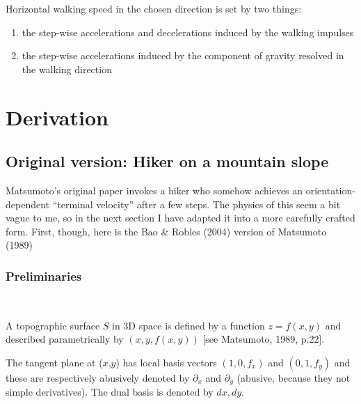 \documentclass[11pt]{article}
\providecommand{\tightlist}{%
      \setlength{\itemsep}{0pt}\setlength{\parskip}{0pt}}
\begin{document}
Horizontal walking speed in the chosen direction is set by two things:

\begin{enumerate}
\def\labelenumi{\arabic{enumi}.}
\tightlist
\item
  the step-wise accelerations and decelerations induced by the walking
  impulses
\item
  the step-wise accelerations induced by the component of gravity
  resolved in the walking direction
\end{enumerate}

    \hypertarget{derivation}{%
\section*{Derivation}\label{derivation}}

    \hypertarget{original-version-hiker-on-a-mountain-slope}{%
\subsection*{Original version: Hiker on a mountain
slope}\label{original-version-hiker-on-a-mountain-slope}}

    Matsumoto's original paper invokes a hiker who somehow achieves an
orientation-dependent ``terminal velocity'' after a few steps. The
physics of this seem a bit vague to me, so in the next section I have
adapted it into a more carefully crafted form. First, though, here is
the Bao \& Robles (2004) version of Matsumoto (1989)

    \hypertarget{preliminaries}{%
\subsubsection*{Preliminaries}\label{preliminaries}}

 
            
    
    \begin{center}
    \end{center}
    { \hspace*{\fill} \\}
    

    A topographic surface \(S\) in 3D space is defined by a function
\(z=f(x,y)\) and described parametrically by \((x,y,f(x,y))\) {[}see
Matsumoto, 1989, p.22{]}.

The tangent plane at (\(x\),\(y\)) has local basis vectors \((1,0,f_x)\)
and \((0,1,f_y)\) and these are respectively abusively denoted by
\(\partial_x\) and \(\partial_y\) (abusive, because they not simple
derivatives). The dual basis is denoted by \(dx, dy\).
\end{document}
